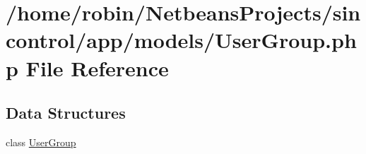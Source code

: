 \hypertarget{_user_group_8php}{}\section{/home/robin/\+Netbeans\+Projects/sincontrol/app/models/\+User\+Group.php File Reference}
\label{_user_group_8php}
\subsection*{Data Structures}
\begin{DoxyCompactItemize}
\item 
class \hyperlink{class_user_group}{User\+Group}
\end{DoxyCompactItemize}
